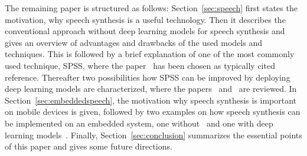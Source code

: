 The remaining paper is structured as follows: Section~\ref{sec:speech} first states the motivation, why speech synthesis is a useful technology. Then it describes the conventional approach without deep learning models for speech synthesis and gives an overview of advantages and drawbacks of the used models and techniques. This is followed by a brief explanation of one of the most commonly used technique, \ac{SPSS}, where the paper~\cite{black:statistical} has been chosen as typically cited reference. Thereafter two possibilities how \ac{SPSS} can be improved by deploying deep learning models are characterized, where the papers~\cite{zen:deepstatistical} and~\cite{hashimoto:effect} are reviewed. In Section~\ref{sec:embeddedspeech}, the motivation why speech synthesis is important on mobile devices is given, followed by two examples on how speech synthesis can be implemented on an embedded system, one without~\cite{toth:optimizing} and one with deep learning models~\cite{boros:robust}. Finally, Section~\ref{sec:conclusion} summarizes the essential points of this paper and gives some future directions.